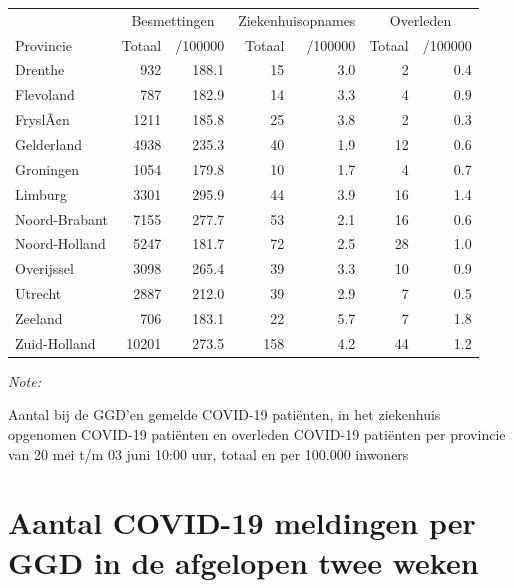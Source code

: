 \documentclass[
  english,
  man,floatsintext]{apa6}
\begin{document}
\begin{table}
\centering
\begin{threeparttable}
\begin{tabular}{lrrrrrr}
\toprule
\multicolumn{1}{c}{ } & \multicolumn{2}{c}{Besmettingen} & \multicolumn{2}{c}{Ziekenhuisopnames} & \multicolumn{2}{c}{Overleden} \\
\cmidrule(l{3pt}r{3pt}){2-3} \cmidrule(l{3pt}r{3pt}){4-5} \cmidrule(l{3pt}r{3pt}){6-7}
Provincie & Totaal & /100000 & Totaal & /100000 & Totaal & /100000\\
\midrule
Drenthe & 932 & 188.1 & 15 & 3.0 & 2 & 0.4\\
Flevoland & 787 & 182.9 & 14 & 3.3 & 4 & 0.9\\
FryslÃ¢n & 1211 & 185.8 & 25 & 3.8 & 2 & 0.3\\
Gelderland & 4938 & 235.3 & 40 & 1.9 & 12 & 0.6\\
Groningen & 1054 & 179.8 & 10 & 1.7 & 4 & 0.7\\
Limburg & 3301 & 295.9 & 44 & 3.9 & 16 & 1.4\\
Noord-Brabant & 7155 & 277.7 & 53 & 2.1 & 16 & 0.6\\
Noord-Holland & 5247 & 181.7 & 72 & 2.5 & 28 & 1.0\\
Overijssel & 3098 & 265.4 & 39 & 3.3 & 10 & 0.9\\
Utrecht & 2887 & 212.0 & 39 & 2.9 & 7 & 0.5\\
Zeeland & 706 & 183.1 & 22 & 5.7 & 7 & 1.8\\
Zuid-Holland & 10201 & 273.5 & 158 & 4.2 & 44 & 1.2\\
\bottomrule
\end{tabular}
\begin{tablenotes}
\item \textit{Note: } 
\item Aantal bij de GGD’en gemelde COVID-19 patiënten, in het ziekenhuis opgenomen COVID-19 patiënten en overleden COVID-19 patiënten per provincie van 20 mei t/m 03 juni 10:00 uur, totaal en per 100.000 inwoners
\end{tablenotes}
\end{threeparttable}
\end{table}

\newpage

\hypertarget{aantal-covid-19-meldingen-per-ggd-in-de-afgelopen-twee-weken}{%
\section{Aantal COVID-19 meldingen per GGD in de afgelopen twee weken}\label{aantal-covid-19-meldingen-per-ggd-in-de-afgelopen-twee-weken}}
\end{document}
